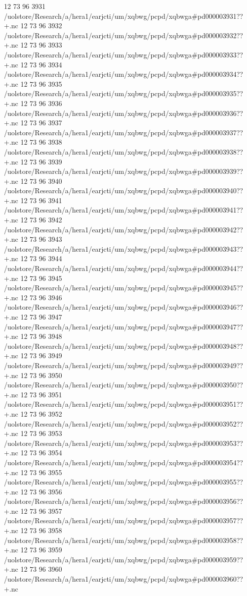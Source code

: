 12 73 96
3931
/uolstore/Research/a/hera1/earjcti/um/xqbwg/pcpd/xqbwga#pd000003931??+.nc
12 73 96
3932
/uolstore/Research/a/hera1/earjcti/um/xqbwg/pcpd/xqbwga#pd000003932??+.nc
12 73 96
3933
/uolstore/Research/a/hera1/earjcti/um/xqbwg/pcpd/xqbwga#pd000003933??+.nc
12 73 96
3934
/uolstore/Research/a/hera1/earjcti/um/xqbwg/pcpd/xqbwga#pd000003934??+.nc
12 73 96
3935
/uolstore/Research/a/hera1/earjcti/um/xqbwg/pcpd/xqbwga#pd000003935??+.nc
12 73 96
3936
/uolstore/Research/a/hera1/earjcti/um/xqbwg/pcpd/xqbwga#pd000003936??+.nc
12 73 96
3937
/uolstore/Research/a/hera1/earjcti/um/xqbwg/pcpd/xqbwga#pd000003937??+.nc
12 73 96
3938
/uolstore/Research/a/hera1/earjcti/um/xqbwg/pcpd/xqbwga#pd000003938??+.nc
12 73 96
3939
/uolstore/Research/a/hera1/earjcti/um/xqbwg/pcpd/xqbwga#pd000003939??+.nc
12 73 96
3940
/uolstore/Research/a/hera1/earjcti/um/xqbwg/pcpd/xqbwga#pd000003940??+.nc
12 73 96
3941
/uolstore/Research/a/hera1/earjcti/um/xqbwg/pcpd/xqbwga#pd000003941??+.nc
12 73 96
3942
/uolstore/Research/a/hera1/earjcti/um/xqbwg/pcpd/xqbwga#pd000003942??+.nc
12 73 96
3943
/uolstore/Research/a/hera1/earjcti/um/xqbwg/pcpd/xqbwga#pd000003943??+.nc
12 73 96
3944
/uolstore/Research/a/hera1/earjcti/um/xqbwg/pcpd/xqbwga#pd000003944??+.nc
12 73 96
3945
/uolstore/Research/a/hera1/earjcti/um/xqbwg/pcpd/xqbwga#pd000003945??+.nc
12 73 96
3946
/uolstore/Research/a/hera1/earjcti/um/xqbwg/pcpd/xqbwga#pd000003946??+.nc
12 73 96
3947
/uolstore/Research/a/hera1/earjcti/um/xqbwg/pcpd/xqbwga#pd000003947??+.nc
12 73 96
3948
/uolstore/Research/a/hera1/earjcti/um/xqbwg/pcpd/xqbwga#pd000003948??+.nc
12 73 96
3949
/uolstore/Research/a/hera1/earjcti/um/xqbwg/pcpd/xqbwga#pd000003949??+.nc
12 73 96
3950
/uolstore/Research/a/hera1/earjcti/um/xqbwg/pcpd/xqbwga#pd000003950??+.nc
12 73 96
3951
/uolstore/Research/a/hera1/earjcti/um/xqbwg/pcpd/xqbwga#pd000003951??+.nc
12 73 96
3952
/uolstore/Research/a/hera1/earjcti/um/xqbwg/pcpd/xqbwga#pd000003952??+.nc
12 73 96
3953
/uolstore/Research/a/hera1/earjcti/um/xqbwg/pcpd/xqbwga#pd000003953??+.nc
12 73 96
3954
/uolstore/Research/a/hera1/earjcti/um/xqbwg/pcpd/xqbwga#pd000003954??+.nc
12 73 96
3955
/uolstore/Research/a/hera1/earjcti/um/xqbwg/pcpd/xqbwga#pd000003955??+.nc
12 73 96
3956
/uolstore/Research/a/hera1/earjcti/um/xqbwg/pcpd/xqbwga#pd000003956??+.nc
12 73 96
3957
/uolstore/Research/a/hera1/earjcti/um/xqbwg/pcpd/xqbwga#pd000003957??+.nc
12 73 96
3958
/uolstore/Research/a/hera1/earjcti/um/xqbwg/pcpd/xqbwga#pd000003958??+.nc
12 73 96
3959
/uolstore/Research/a/hera1/earjcti/um/xqbwg/pcpd/xqbwga#pd000003959??+.nc
12 73 96
3960
/uolstore/Research/a/hera1/earjcti/um/xqbwg/pcpd/xqbwga#pd000003960??+.nc
